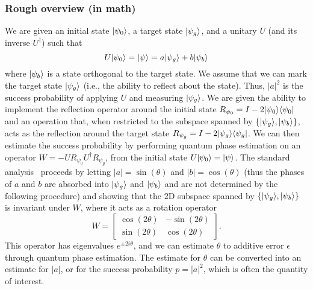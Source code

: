 \begin{refsection}
\subsubsection*{Rough overview (in math)}
We are given an initial state $\lvert\psi_0\rangle$, a target state $\lvert\psi_g\rangle$, and a unitary $U$ (and its inverse $U^\dag$) such that
\begin{equation}
    U\lvert\psi_0\rangle = \lvert\psi\rangle = a \lvert\psi_g\rangle + b\lvert\psi_b\rangle
\end{equation}
where $\lvert\psi_b\rangle$ is a state orthogonal to the target state. We assume that we can mark the target state $\lvert\psi_g\rangle$ (i.e., the ability to reflect about the state). Thus, $|a|^2$ is the success probability of applying $U$ and measuring $\lvert\psi_g\rangle$. We are given the ability to implement the reflection operator around the initial state $R_{\psi_0} = I - 2\lvert\psi_0\rangle\langle\psi_0\rvert$ and an operation that, when restricted to the subspace spanned by $\{ \lvert\psi_g\rangle, \lvert\psi_b\rangle \}$, acts as the reflection around the target state $R_{\psi_g} = I - 2\lvert\psi_g\rangle\langle\psi_g\rvert$.  
We can then estimate the success probability by performing quantum phase estimation on an operator $W = - U R_{\psi_0} U^\dag R_{\psi_g}$, from the initial state $U \lvert\psi_0\rangle = \lvert\psi\rangle$. The standard analysis~\cite{brassard2002AmpAndEst} proceeds by letting $|a|=\sin(\theta)$ and $|b|=\cos(\theta)$ (thus the phases of $a$ and $b$ are absorbed into $\lvert\psi_g\rangle$ and $\lvert\psi_b\rangle$ and are not determined by the following procedure) and showing that the 2D subspace spanned by $\{\lvert\psi_g\rangle, \lvert\psi_b\rangle\}$ is invariant under $W$, where it acts as a rotation operator 
\begin{equation}
    W = \left[\begin{array}{cc} \cos(2\theta) & -\sin(2\theta) \\ \sin(2\theta) & \cos(2\theta)    \end{array}\right].
\end{equation}
This operator has eigenvalues $e^{\pm 2 i \theta}$, and we can estimate $\theta$ to additive error $\epsilon$ through quantum phase estimation. The estimate for $\theta$ can be converted into an estimate for $|a|$, or for the success probability $p=|a|^2$, which is often the quantity of interest.






\end{refsection}

